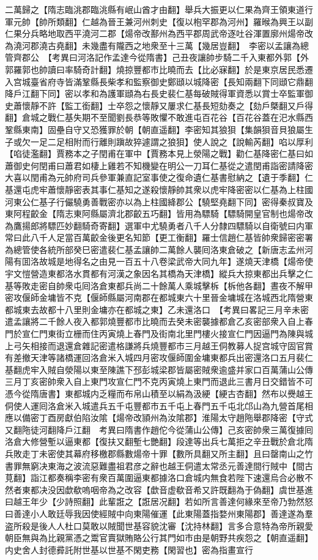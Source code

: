 二萬歸之【隋志臨洮郡臨洮縣有岷山酋才由翻】舉兵大振更以仁果為齊王領東道行軍元帥【帥所類翻】仁越為晉王兼河州刺史【復以枹罕郡為河州】羅㬋為興王以副仁果分兵略地取西平澆河二郡【煬帝改鄯州為西平郡周武帝逐吐谷渾置廓州煬帝改為澆河郡澆古堯翻】未幾盡有隴西之地衆至十三萬【幾居豈翻】　李密以孟讓為總管齊郡公　【考異曰河洛記作孟達今從隋書】己丑夜讓帥步騎二千入東都外郭【外郭羅郭也帥讀曰率騎奇計翻】燒掠豐都市比曉而去【比必寐翻】於是東京居民悉遷入宫城臺省府寺皆滿鞏縣長柴孝和監察御史鄭頲以城降密【長知兩翻下同頲它鼎翻降戶江翻下同】密以孝和為護軍頲為右長史裴仁基每破賊得軍資悉以賞士卒監軍御史蕭懷靜不許【監工銜翻】士卒怨之懷靜又屢求仁基長短劾奏之【劾戶槩翻又戶得翻】倉城之戰仁基失期不至聞劉長恭等敗懼不敢進屯百花谷【百花谷蓋在汜水縣西鞏縣東南】固壘自守又恐獲罪於朝【朝直遥翻】李密知其狼狽【集韻狽音貝狼屬生子或欠一足二足相附而行離則蹎故猝遽謂之狼狽】使人說之【說輸芮翻】啗以厚利【啗徒濫翻】賈務本之子閏甫在軍中【賈務本見上滎陽之戰】勸仁基降密仁基曰如蕭御史何閏甫曰蕭君如棲上雞若不知機變在明公一刀耳仁基從之遣閏甫詣密請降密大喜以閏甫為元帥府司兵參軍兼直記室事使之復命遺仁基書慰納之【遺于季翻】仁基還屯虎牢蕭懷靜密表其事仁基知之遂殺懷靜帥其衆以虎牢降密密以仁基為上柱國河東公仁基子行儼驍勇善戰密亦以為上柱國絳郡公【驍堅堯翻下同】密得秦叔寶及東阿程齩金【隋志東阿縣屬濟北郡齩五巧翻】皆用為驃騎【驃騎開皇官制也煬帝改為鷹揚郎將驃匹妙翻騎奇寄翻】選軍中尤驍勇者八千人分隸四驃騎以自衛號曰内軍常曰此八千人足當百萬齩金後更名知節【更工衡翻】羅士信趙仁基皆帥衆歸密密署為總管使各統所部癸巳密遣裴仁基孟讓帥二萬餘人襲囘洛東倉破之【新唐志孟州河陽有囬洛故城是地得名之由見一百五十八卷梁武帝大同九年】遂燒天津橋【煬帝使宇文愷營造東都洛水貫都有河漢之象因名其橋為天津橋】縱兵大掠東都出兵擊之仁基等敗走密自帥衆屯囘洛倉東都兵尚二十餘萬人乘城擊柝【柝他各翻】晝夜不解甲密攻偃師金墉皆不克【偃師縣屬河南郡在都城東六十里晉金墉城在洛城西北隋營東都城東去故都十八里則金墉亦在都城之東】乙未還洛口　【考異曰畧記三月辛未密遣孟讓將二千餘人夜入都郭燒豐都市比曉而去癸未密襲據都倉乙亥密部衆入自上春門於宣仁門東街立栅而住丙寅燒上春門及街南北里門樓火接宣仁門因逼門為陳與城上弓矢相接而退還倉雜記密遣格謙將兵燒豐都市三月越王侗教募人捉宫城守固官賞有差撤天津等諸橋運回洛倉米入城四月密攻偃師圍金墉東都兵出密還洛口五月裴仁基翻虎牢入賊自滎陽以東至陳譙下邳彭城梁郡皆屬密賊衆逾盛并家口百萬蒲山公傳三月丁亥密帥衆入自上東門攻宣仁門不克丙寅燒上東門而退此三書月日交錯皆不可憑今從隋唐書】東都城内乏糧而布帛山積至以絹為汲綆【綆古杏翻】然布以㸑越王侗使人運囘洛倉米入城遣兵五千屯豐都市五千屯上春門五千屯北邙山為九營首尾相應以備密丁酉房獻伯陷汝隂【煬帝改頴州為汝隂郡】淮陽太守趙陁舉郡降密【守式又翻陁徒河翻降戶江翻　考異曰隋書作趙佗今從蒲山公傳】己亥密帥衆三萬復據囘洛倉大修營塹以逼東都【復扶又翻塹七艷翻】段達等出兵七萬拒之辛丑戰於倉北隋兵敗走丁未密使其幕府移檄郡縣數煬帝十罪【數所具翻又所主翻】且曰罄南山之竹書罪無窮决東海之波流惡難盡祖君彦之辭也越王侗遣太常丞元善達間行賊中【間古莧翻】詣江都奏稱李密有衆百萬圍逼東都據洛口倉城内無食若陛下速還烏合必散不然者東都决没因歔欷嗚咽帝為之改容【歔音虚欷音希又許既翻為于偽翻】虞世基進曰越王年少【少詩照翻】此輩誑之【誑居况翻】若如所言善達何緣來至帝乃勃然怒曰善達小人敢廷辱我因使經賊中向東陽催運【此東陽蓋指婺州東陽郡】善達遂為羣盗所殺是後人人杜口莫敢以賊聞世基容貌沈審【沈持林翻】言多合意特為帝所親愛朝臣無與為比親黨憑之鬻官賣獄賄賂公行其門如市由是朝野共疾怨之【朝直遥翻】内史舍人封德彛託附世基以世基不閑吏務【閑習也】密為指畫宣行